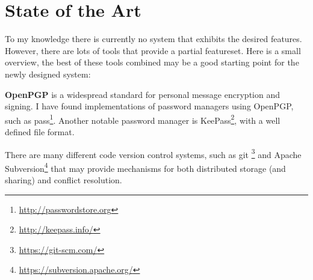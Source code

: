 \section{State of the Art}

To my knowledge there is currently no system that exhibits the desired
features. However, there are lots of tools that provide a partial featureset.
Here is a small overview, the best of these tools combined may be a good
starting point for the newly designed system:

\textbf{OpenPGP}\cite{openpgp} is a widespread standard for personal message
encryption and signing. I have found implementations of password managers using
OpenPGP, such as pass\footnote{\url{http://passwordstore.org}}. Another notable
password manager is KeePass\footnote{\url{http://keepass.info/}}, with a well
defined file format.

There are many different code version control systems, such as git
\footnote{\url{https://git-scm.com/}} and Apache
Subversion\footnote{\url{https://subversion.apache.org/}} that may provide
mechanisms for both distributed storage (and sharing) and conflict resolution.
